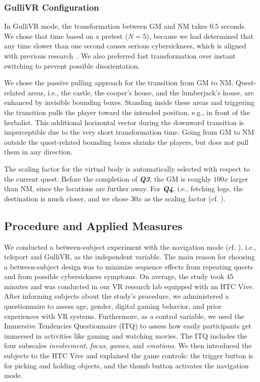 \documentclass{sigchi}
\begin{document}
\subsubsection{GulliVR Configuration}




In GulliVR mode, the transformation between GM and NM takes $0.5$ seconds. We chose that time based on a pretest ($N = 5$), because we had determined that any time slower than one second causes serious cybersickness, which is aligned with previous research~\cite{Habgood:2017:HLP:3130859.3131437}. We also preferred fast transformation over instant switching to prevent possible disorientation.

We chose the passive pulling approach for the transition from GM to NM. Quest-related areas, i.e., the castle, the cooper's house, and the lumberjack's house, are enhanced by invisible bounding boxes. Standing inside these areas and triggering the transition pulls the player toward the intended position, e.g., in front of the herbalist. This additional horizontal vector during the downward transition is imperceptible due to the very short transformation time. Going from GM to NM outside the quest-related bounding boxes shrinks the players, but does not pull them in any direction.

The scaling factor for the virtual body is automatically selected with respect to the current quest. Before the completion of \textit{\textbf{Q3}}, the GM is roughly $100x$ larger than NM, since the locations are further away. For \textit{\textbf{Q4}}, i.e., fetching logs, the destination is much closer, and we chose $30x$ as the scaling factor (cf. ).




\subsection{Procedure and Applied Measures}

We conducted a between-subject experiment with the navigation mode (cf. ), i.e., teleport and GulliVR, as the independent variable. The main reason for choosing a between-subject design was to minimize sequence effects from repeating quests and from possible cybersickness symptoms. On average, the study took 45 minutes and was conducted in our VR research lab equipped with an HTC Vive. After informing subjects about the study's procedure, we administered a questionnaire to assess age, gender, digital gaming behavior, and prior experiences with VR systems. 
Furthermore, as a control variable, we used the Immersive Tendencies Questionnaire (ITQ) \cite{Witmer.1998} to assess how easily participants get immersed in activities like gaming and watching movies. The ITQ includes the four subscales \textit{involvement}, \textit{focus}, \textit{games}, and \textit{emotions}.
We then introduced the subjects to the HTC Vive and explained the game controls: the trigger button is for picking and holding objects, and the thumb button activates the navigation mode.
\end{document}
